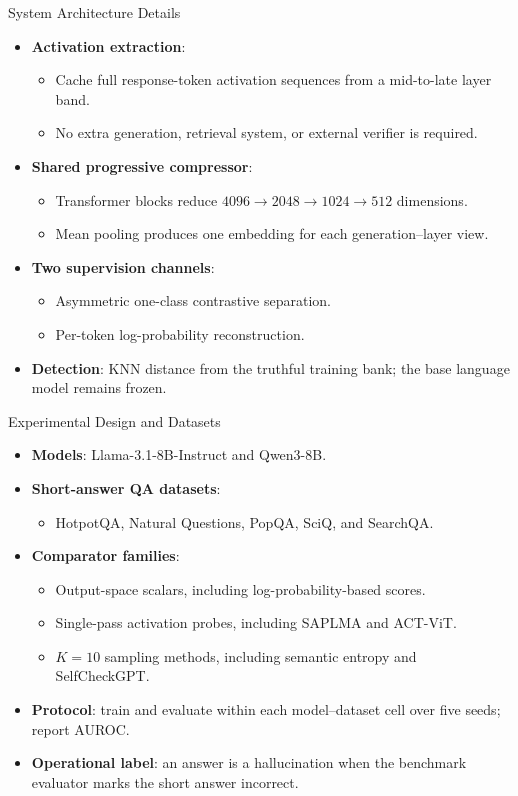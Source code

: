 \documentclass[aspectratio=1610]{beamer}
\begin{document}
\begin{frame}{System Architecture Details}
\begin{itemize}
  \item \textbf{Activation extraction}:
  \begin{itemize}
    \item Cache full response-token activation sequences from a mid-to-late layer band.
    \item No extra generation, retrieval system, or external verifier is required.
  \end{itemize}
  \item \textbf{Shared progressive compressor}:
  \begin{itemize}
    \item Transformer blocks reduce $4096\rightarrow2048\rightarrow1024\rightarrow512$ dimensions.
    \item Mean pooling produces one embedding for each generation--layer view.
  \end{itemize}
  \item \textbf{Two supervision channels}:
  \begin{itemize}
    \item Asymmetric one-class contrastive separation.
    \item Per-token log-probability reconstruction.
  \end{itemize}
  \item \textbf{Detection}: KNN distance from the truthful training bank; the base language model remains frozen.
\end{itemize}
\end{frame}

\begin{frame}{Experimental Design and Datasets}
\begin{itemize}
  \item \textbf{Models}: Llama-3.1-8B-Instruct and Qwen3-8B.
  \item \textbf{Short-answer QA datasets}:
  \begin{itemize}
    \item HotpotQA, Natural Questions, PopQA, SciQ, and SearchQA.
  \end{itemize}
  \item \textbf{Comparator families}:
  \begin{itemize}
    \item Output-space scalars, including log-probability-based scores.
    \item Single-pass activation probes, including SAPLMA and ACT-ViT.
    \item $K=10$ sampling methods, including semantic entropy and SelfCheckGPT.
  \end{itemize}
  \item \textbf{Protocol}: train and evaluate within each model--dataset cell over five seeds; report AUROC.
  \item \textbf{Operational label}: an answer is a hallucination when the benchmark evaluator marks the short answer incorrect.
\end{itemize}
\end{frame}
\end{document}
